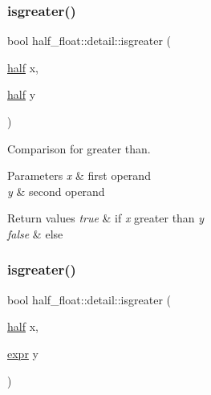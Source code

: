 \subsubsection{\texorpdfstring{isgreater()}{isgreater()}\hspace{0.1cm}{\footnotesize\ttfamily [1/4]}}
{\footnotesize\ttfamily bool half\+\_\+float\+::detail\+::isgreater (\begin{DoxyParamCaption}\item[{\hyperlink{classhalf__float_1_1half}{half}}]{x,  }\item[{\hyperlink{classhalf__float_1_1half}{half}}]{y }\end{DoxyParamCaption})\hspace{0.3cm}{\ttfamily [inline]}}

Comparison for greater than. 
\begin{DoxyParams}{Parameters}
{\em x} & first operand \\
\hline
{\em y} & second operand \\
\hline
\end{DoxyParams}

\begin{DoxyRetVals}{Return values}
{\em true} & if {\itshape x} greater than {\itshape y} \\
\hline
{\em false} & else \\
\hline
\end{DoxyRetVals}
\mbox{\label{namespacehalf__float_1_1detail_a78e952bbbc53aeb9a9b1e21a8bfa72d7}} 
\subsubsection{\texorpdfstring{isgreater()}{isgreater()}\hspace{0.1cm}{\footnotesize\ttfamily [2/4]}}
{\footnotesize\ttfamily bool half\+\_\+float\+::detail\+::isgreater (\begin{DoxyParamCaption}\item[{\hyperlink{classhalf__float_1_1half}{half}}]{x,  }\item[{\hyperlink{structhalf__float_1_1detail_1_1expr}{expr}}]{y }\end{DoxyParamCaption})\hspace{0.3cm}{\ttfamily [inline]}}

